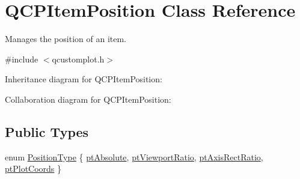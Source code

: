 \hypertarget{class_q_c_p_item_position}{}\section{Q\+C\+P\+Item\+Position Class Reference}
\label{class_q_c_p_item_position}


Manages the position of an item.  




{\ttfamily \#include $<$qcustomplot.\+h$>$}



Inheritance diagram for Q\+C\+P\+Item\+Position\+:


Collaboration diagram for Q\+C\+P\+Item\+Position\+:
\subsection*{Public Types}
\begin{DoxyCompactItemize}
\item 
enum \hyperlink{class_q_c_p_item_position_aad9936c22bf43e3d358552f6e86dbdc8}{Position\+Type} \{ \hyperlink{class_q_c_p_item_position_aad9936c22bf43e3d358552f6e86dbdc8a564f5e53e550ead1ec5fc7fc7d0b73e0}{pt\+Absolute}, 
\hyperlink{class_q_c_p_item_position_aad9936c22bf43e3d358552f6e86dbdc8ac7d6aa89ceacb39658b0d6da061c789a}{pt\+Viewport\+Ratio}, 
\hyperlink{class_q_c_p_item_position_aad9936c22bf43e3d358552f6e86dbdc8a01080fd00eaf09fa238ef6b73bbfef75}{pt\+Axis\+Rect\+Ratio}, 
\hyperlink{class_q_c_p_item_position_aad9936c22bf43e3d358552f6e86dbdc8ad5ffb8dc99ad73263f7010c77342294c}{pt\+Plot\+Coords}
 \}
\end{DoxyCompactItemize}
